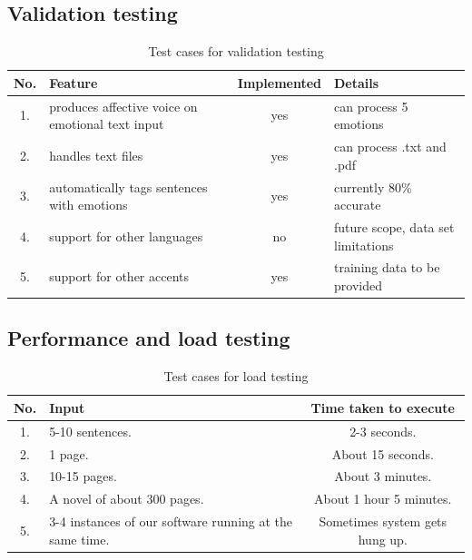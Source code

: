 \documentclass[oneside,a4paper,12pt]{book}
\begin{document}
\subsection{Validation testing}   
\begin{table}[!htbp]
	\def\arraystretch{1.5}
	\begin{tabularx}{\textwidth}{|c|X|c|X|}
		\hline 
		No. & Feature	& Implemented & Details \\ \hline
		1. & produces affective voice on emotional text input & yes & can process 5 emotions \\ \hline
		2. & handles text files & yes & can process .txt and .pdf \\ \hline
		3. & automatically tags sentences with emotions & yes & currently 80\% accurate \\ \hline
		4. & support for other languages & no & future scope, data set limitations \\ \hline
		5. & support for other accents & yes & training data to be provided \\ \hline
	\end{tabularx}
	\caption{Test cases for validation testing}
	\label{tab:testcases}
\end{table}

\subsection{Performance and load testing}   
\begin{table}[!htbp]
	\def\arraystretch{1.5}
	\begin{tabularx}{\textwidth}{|c|X|c|}
		\hline 
		No. & Input	& Time taken to execute \\ \hline
		1. & 5-10 sentences. & 2-3 seconds. \\ \hline
		2. & 1 page. & About 15 seconds. \\ \hline
		3. & 10-15 pages. & About 3 minutes. \\ \hline
		4. & A novel of about 300 pages. & About 1 hour 5 minutes. \\ \hline
		5. & 3-4 instances of our software running at the same time. & Sometimes system gets hung up. \\ \hline
	\end{tabularx}
	\caption{Test cases for load testing}
	\label{tab:testcases}
\end{table}

\newpage
\end{document}
